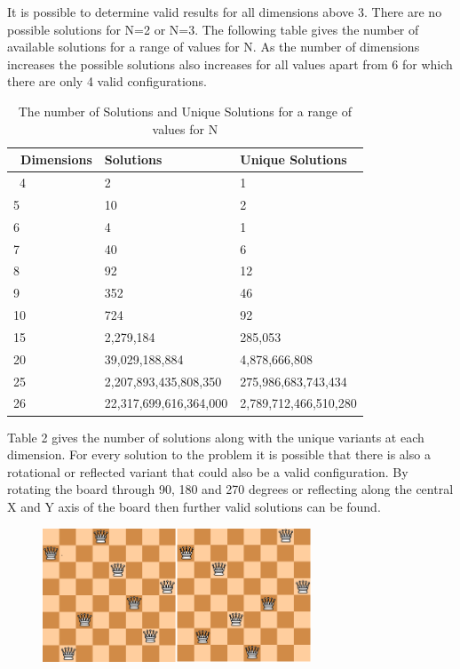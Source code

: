 \documentclass[conference]{IEEEtran}
\begin{document}
It is possible to determine valid results for all dimensions above 3. There are no possible solutions for N=2 or N=3. The following table gives the number of available solutions for a range of values for N. As the number of dimensions increases the possible solutions also increases for all values apart from 6 for which there are only 4 valid configurations. 

\begin{table}[ht]
\begin{tabular}{|p{2cm}|p{6cm}|p{6cm}|} 
		\hline\
		Dimensions & Solutions & Unique Solutions \\
		\hline\
		4 & 2 & 1 \\ 
		5 & 10 & 2 \\
		6 & 4 & 1 \\
		7 & 40 & 6 \\
		8 & 92 & 12 \\
		9 & 352 & 46 \\
		10 & 724 & 92 \\
		15 & 2,279,184 & 285,053 \\
		20 & 39,029,188,884 & 4,878,666,808 \\
		25 & 2,207,893,435,808,350  & 275,986,683,743,434 \\
		26 & 22,317,699,616,364,000 & 2,789,712,466,510,280 \\
		\hline
	\end{tabular}
	\caption{The number of Solutions and Unique Solutions for a range of values for N}
\end{table}

Table 2 gives the number of solutions along with the unique variants at each dimension. For every solution to the problem it is possible that there is also a rotational or reflected variant that could also be a valid configuration. By rotating the board through 90, 180 and 270 degrees or reflecting along the central X and Y axis of the board then further valid solutions can be found.

\begin{figure}[!htbp]
	\centering	
	\includegraphics[width=8cm, height=4cm]{NQueensRotation1}
\end{figure}
\end{document}
